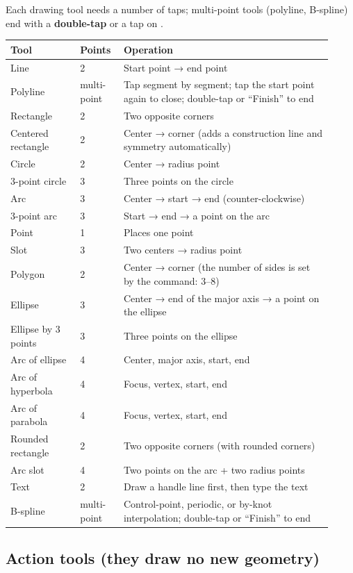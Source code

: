 Each drawing tool needs a number of taps; multi-point tools (polyline, B-spline) end with a \textbf{double-tap} or a tap
on .

\begin{longtable}{@{}p{0.20\linewidth}p{0.12\linewidth}p{0.60\linewidth}@{}}
\toprule \textbf{Tool} & \textbf{Points} & \textbf{Operation} \\ \midrule \endhead
Line & 2 & Start point → end point \\
Polyline & multi-point & Tap segment by segment; tap the start point again to close; double-tap or ``Finish'' to end \\
Rectangle & 2 & Two opposite corners \\
Centered rectangle & 2 & Center → corner (adds a construction line and symmetry automatically)\\
Circle & 2 & Center → radius point \\
3-point circle & 3 & Three points on the circle \\
Arc & 3 & Center → start → end (counter-clockwise)\\
3-point arc & 3 & Start → end → a point on the arc \\
Point & 1 & Places one point \\
Slot & 3 & Two centers → radius point \\
Polygon & 2 & Center → corner (the number of sides is set by the command: 3--8)\\
Ellipse & 3 & Center → end of the major axis → a point on the ellipse \\
Ellipse by 3 points & 3 & Three points on the ellipse \\
Arc of ellipse & 4 & Center, major axis, start, end \\
Arc of hyperbola & 4 & Focus, vertex, start, end \\
Arc of parabola & 4 & Focus, vertex, start, end \\
Rounded rectangle & 2 & Two opposite corners (with rounded corners)\\
Arc slot & 4 & Two points on the arc + two radius points \\
Text & 2 & Draw a handle line first, then type the text \\
B-spline & multi-point & Control-point, periodic, or by-knot interpolation; double-tap or ``Finish'' to end \\
\bottomrule
\end{longtable}

\subsection{Action tools (they draw no new geometry)}

